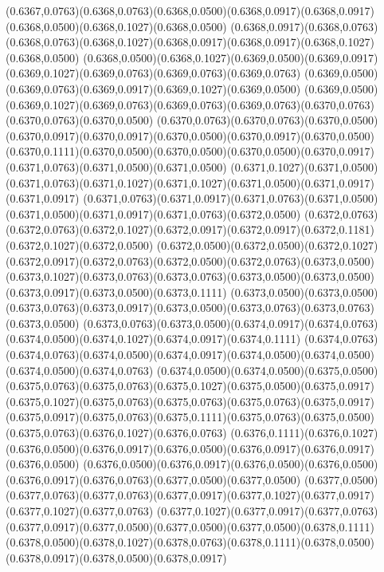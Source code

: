 (0.6367,0.0763)(0.6368,0.0763)(0.6368,0.0500)(0.6368,0.0917)(0.6368,0.0917)(0.6368,0.0500)(0.6368,0.1027)(0.6368,0.0500)
(0.6368,0.0917)(0.6368,0.0763)(0.6368,0.0763)(0.6368,0.1027)(0.6368,0.0917)(0.6368,0.0917)(0.6368,0.1027)(0.6368,0.0500)
(0.6368,0.0500)(0.6368,0.1027)(0.6369,0.0500)(0.6369,0.0917)(0.6369,0.1027)(0.6369,0.0763)(0.6369,0.0763)(0.6369,0.0763)
(0.6369,0.0500)(0.6369,0.0763)(0.6369,0.0917)(0.6369,0.1027)(0.6369,0.0500)
\PST@Solid(0.6369,0.0500)(0.6369,0.1027)(0.6369,0.0763)(0.6369,0.0763)(0.6369,0.0763)(0.6370,0.0763)(0.6370,0.0763)(0.6370,0.0500)
(0.6370,0.0763)(0.6370,0.0763)(0.6370,0.0500)(0.6370,0.0917)(0.6370,0.0917)(0.6370,0.0500)(0.6370,0.0917)(0.6370,0.0500)
(0.6370,0.1111)(0.6370,0.0500)(0.6370,0.0500)(0.6370,0.0500)(0.6370,0.0917)(0.6371,0.0763)(0.6371,0.0500)(0.6371,0.0500)
(0.6371,0.1027)(0.6371,0.0500)(0.6371,0.0763)(0.6371,0.1027)(0.6371,0.1027)(0.6371,0.0500)(0.6371,0.0917)(0.6371,0.0917)
(0.6371,0.0763)(0.6371,0.0917)(0.6371,0.0763)(0.6371,0.0500)(0.6371,0.0500)(0.6371,0.0917)(0.6371,0.0763)(0.6372,0.0500)
(0.6372,0.0763)(0.6372,0.0763)(0.6372,0.1027)(0.6372,0.0917)(0.6372,0.0917)(0.6372,0.1181)(0.6372,0.1027)(0.6372,0.0500)
(0.6372,0.0500)(0.6372,0.0500)(0.6372,0.1027)(0.6372,0.0917)(0.6372,0.0763)(0.6372,0.0500)(0.6372,0.0763)(0.6373,0.0500)
(0.6373,0.1027)(0.6373,0.0763)(0.6373,0.0763)(0.6373,0.0500)(0.6373,0.0500)(0.6373,0.0917)(0.6373,0.0500)(0.6373,0.1111)
(0.6373,0.0500)(0.6373,0.0500)(0.6373,0.0763)(0.6373,0.0917)(0.6373,0.0500)(0.6373,0.0763)(0.6373,0.0763)(0.6373,0.0500)
(0.6373,0.0763)(0.6373,0.0500)(0.6374,0.0917)(0.6374,0.0763)(0.6374,0.0500)(0.6374,0.1027)(0.6374,0.0917)(0.6374,0.1111)
(0.6374,0.0763)(0.6374,0.0763)(0.6374,0.0500)(0.6374,0.0917)(0.6374,0.0500)(0.6374,0.0500)(0.6374,0.0500)(0.6374,0.0763)
(0.6374,0.0500)(0.6374,0.0500)(0.6375,0.0500)(0.6375,0.0763)(0.6375,0.0763)(0.6375,0.1027)(0.6375,0.0500)(0.6375,0.0917)
(0.6375,0.1027)(0.6375,0.0763)(0.6375,0.0763)(0.6375,0.0763)(0.6375,0.0917)
\PST@Solid(0.6375,0.0917)(0.6375,0.0763)(0.6375,0.1111)(0.6375,0.0763)(0.6375,0.0500)(0.6375,0.0763)(0.6376,0.1027)(0.6376,0.0763)
(0.6376,0.1111)(0.6376,0.1027)(0.6376,0.0500)(0.6376,0.0917)(0.6376,0.0500)(0.6376,0.0917)(0.6376,0.0917)(0.6376,0.0500)
(0.6376,0.0500)(0.6376,0.0917)(0.6376,0.0500)(0.6376,0.0500)(0.6376,0.0917)(0.6376,0.0763)(0.6377,0.0500)(0.6377,0.0500)
(0.6377,0.0500)(0.6377,0.0763)(0.6377,0.0763)(0.6377,0.0917)(0.6377,0.1027)(0.6377,0.0917)(0.6377,0.1027)(0.6377,0.0763)
(0.6377,0.1027)(0.6377,0.0917)(0.6377,0.0763)(0.6377,0.0917)(0.6377,0.0500)(0.6377,0.0500)(0.6377,0.0500)(0.6378,0.1111)
(0.6378,0.0500)(0.6378,0.1027)(0.6378,0.0763)(0.6378,0.1111)(0.6378,0.0500)(0.6378,0.0917)(0.6378,0.0500)(0.6378,0.0917)

